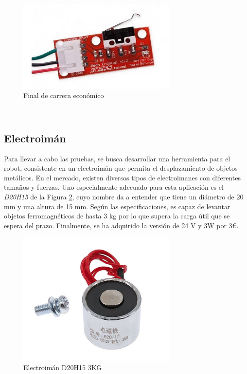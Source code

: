 \begin{figure} [ht!]
  \begin{center}
    \includegraphics[width=8cm]{figs/finaldecarrera.jpg}
  \end{center}
  \caption{Final de carrera económico}
  \label{fig:finalcarrera}
\end{figure}\ 

\subsection{Electroimán}
\noindent Para llevar a cabo las pruebas, se busca desarrollar una herramienta para el robot, consistente en un electroimán que permita 
el desplazamiento de objetos metálicos. En el mercado, existen diversos tipos de electroimanes con diferentes tamaños y fuerzas. Uno 
especialmente adecuado para esta aplicación es el \textit{D20H15} de la Figura \ref{fig:d20}, cuyo nombre da a entender que tiene un diámetro de 20 mm y una altura de 15 mm. 
Según las especificaciones, es capaz de levantar objetos ferromagnéticos de hasta 3 kg por lo que supera la carga útil que se espera del prazo. Finalmente, 
se ha adquirido la versión de 24 V y 3W por 3\euro.

\begin{figure} [ht!]
  \begin{center}
    \includegraphics[width=8cm]{figs/d20h15.jpg}
  \end{center}
  \caption{Electroimán D20H15 3KG}
  \label{fig:d20}
\end{figure}\ 


